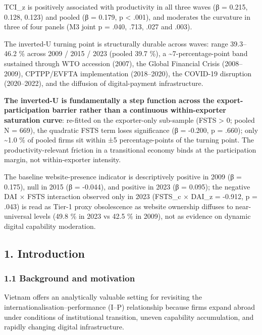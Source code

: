 \documentclass[12pt,a4paper]{article}
\begin{document}
TCI\_z is positively associated with productivity in all three waves (β
= 0.215, 0.128, 0.123) and pooled (β = 0.179, p \textless{} .001), and
moderates the curvature in three of four panels (M3 joint p = .040,
.713, .027 and .003).

The inverted-U turning point is structurally durable across waves: range
39.3--46.2 \% across 2009 / 2015 / 2023 (pooled 39.7 \%), a
\textasciitilde7-percentage-point band sustained through WTO accession
(2007), the Global Financial Crisis (2008--2009), CPTPP/EVFTA
implementation (2018--2020), the COVID-19 disruption (2020--2022), and
the diffusion of digital-payment infrastructure.

\textbf{The inverted-U is fundamentally a step function across the
export-participation barrier rather than a continuous within-exporter
saturation curve}: re-fitted on the exporter-only sub-sample (FSTS
\textgreater{} 0; pooled N = 669), the quadratic FSTS term loses
significance (β = -0.200, p = .660); only \textasciitilde1.0 \% of
pooled firms sit within ±5 percentage-points of the turning point. The
productivity-relevant friction in a transitional economy binds at the
participation margin, not within-exporter intensity.

The baseline website-presence indicator is descriptively positive in
2009 (β = 0.175), null in 2015 (β = -0.044), and positive in 2023 (β =
0.095); the negative DAI × FSTS interaction observed only in 2023
(FSTS\_c × DAI\_z = -0.912, p = .043) is read as Tier-1 proxy
obsolescence as website ownership diffuses to near-universal levels
(49.8 \% in 2023 vs 42.5 \% in 2009), not as evidence on dynamic digital
capability moderation.

\hypertarget{1-introduction}{%
\subsection{1. Introduction}\label{1-introduction}}

\hypertarget{11-background-and-motivation}{%
\subsubsection{1.1 Background and
motivation}\label{11-background-and-motivation}}

Vietnam offers an analytically valuable setting for revisiting the
internationalisation--performance (I--P) relationship because firms
expand abroad under conditions of institutional transition, uneven
capability accumulation, and rapidly changing digital infrastructure.
\end{document}
